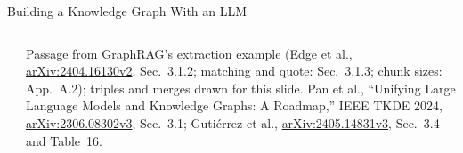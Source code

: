 \begin{frame}{Building a Knowledge Graph With an LLM}
\begin{columns}[T,onlytextwidth]
{}\\[0.3em]
      {\scriptsize Passage from GraphRAG's extraction example (Edge et al., \href{https://arxiv.org/abs/2404.16130v2}{arXiv:2404.16130v2}, Sec.~3.1.2; matching and quote: Sec.~3.1.3; chunk sizes: App.~A.2); triples and merges drawn for this slide. Pan et al., ``Unifying Large Language Models and Knowledge Graphs: A Roadmap,'' IEEE TKDE 2024, \href{https://arxiv.org/abs/2306.08302v3}{arXiv:2306.08302v3}, Sec.~3.1; Guti\'errez et al., \href{https://arxiv.org/abs/2405.14831v3}{arXiv:2405.14831v3}, Sec.~3.4 and Table~16.\par}
  \end{columns}
\end{frame}

